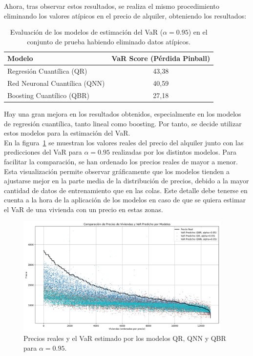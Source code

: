 \documentclass[11pt]{book}
\theoremstyle{plain} %
\theoremstyle{definition} %
\begin{document}
Ahora, tras observar estos resultados, se realiza el mismo procedimiento eliminando 
los valores atípicos en el precio de alquiler, obteniendo los resultados:\\
\newpage
\begin{table}[h!]
   \centering
   \begin{tabular}{|l|c|}
      \hline
      \textbf{Modelo} & \textbf{VaR Score (Pérdida Pinball)} \\
      \hline
      Regresión Cuantílica (QR) & 43,38 \\
      Red Neuronal Cuantílica (QNN) & 40,59\\
      Boosting Cuantílico (QBR) & 27,18 \\
      \hline
   \end{tabular}
   \caption{Evaluación de los modelos de estimación del VaR ($\alpha=0.95$) en el conjunto de prueba habiendo eliminado datos atípicos.}
   \label{tab:var_scores}
 \end{table}               

Hay una gran mejora en los resultados obtenidos, especialmente en los 
modelos de regresión cuantílica, tanto lineal como boosting. Por tanto, 
se decide utilizar estos modelos para la estimación del VaR.\\



En la figura~\ref{fig:var_predictions} se muestran los valores reales del precio del alquiler junto 
con las predicciones del VaR para $\alpha=0.95$ 
realizadas por los distintos modelos. Para facilitar la comparación, se han 
ordenado los precios reales de mayor a menor. Esta visualización permite observar gráficamente que los modelos 
tienden a ajustarse mejor en la parte media de la distribución de precios, 
debido a la mayor cantidad de datos de entrenamiento que en las colas. Este 
detalle debe tenerse en cuenta a la hora de la aplicación de los modelos en 
caso de que se quiera estimar el VaR de una vivienda con un precio en estas zonas.\\

\begin{figure}[H]
   \centering
   \includegraphics[width=0.95\textwidth]{prediction.png}
   \caption{Precios reales y el VaR estimado por los modelos QR, QNN y QBR para $\alpha=0.95$.}
   \label{fig:var_predictions}
\end{figure}
\end{document}
